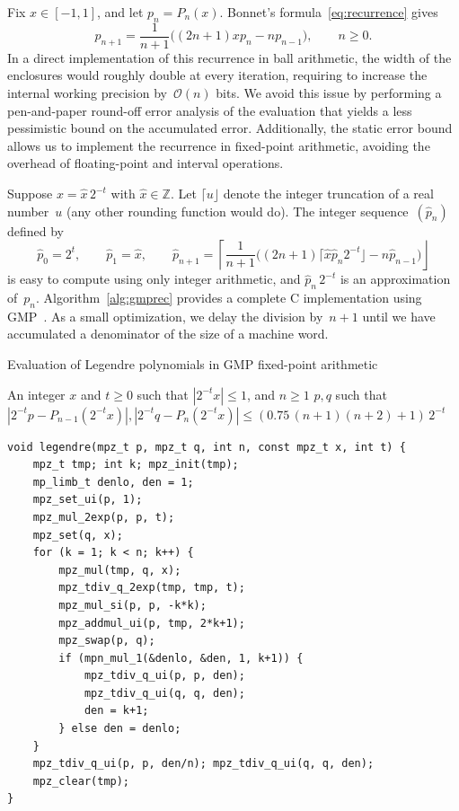 \documentclass{siamart0216}
\newcommand{\OO}{\mathcal{O}}
\begin{document}
Fix $x \in [-1, 1]$, and let $p_n = P_n(x)$.
Bonnet's formula~\eqref{eq:recurrence} gives
\begin{equation} \label{eq:rec-bis}
  p_{n + 1} =
    \frac{1}{n+1}
    \bigl( (2n +1) x p_n - n p_{n-1} \bigr),
  \qquad n \geq 0.
\end{equation}
In a direct implementation of this recurrence in ball arithmetic, the
width of the enclosures would roughly double at every iteration,
requiring to increase the internal working precision by $\OO(n)$ bits.
We avoid this issue by performing a pen-and-paper round-off error
analysis of the evaluation that yields a less pessimistic bound on the
accumulated error.
Additionally, the static error bound allows us to implement the
recurrence in fixed-point arithmetic, avoiding the overhead of
floating-point and interval operations.

Suppose $x = \hat x \, 2^{-t}$ with $\hat x \in \mathbb Z$.
Let $\lceil u \rfloor$ denote the integer truncation of a real
number~$u$ (any other rounding function would do).
The integer sequence $(\hat p_n)$ defined by
\begin{equation} \label{eq:rec-fxpt}
  \hat{p}_0 = 2^t, \qquad
  \hat{p}_1 = \hat x, \qquad
  \hat{p}_{n + 1} =
    \left\lceil \frac{1}{n + 1}  \bigl( (2 n + 1) \lceil \hat{x}
      \hat{p}_n 2^{- t} \rfloor - n \hat{p}_{n - 1} \bigr)
    \right\rfloor
\end{equation}
is easy to compute using only integer arithmetic, and
$\hat p_n \, 2^{-t}$ is an approximation of~$p_n$.
Algorithm~\ref{alg:gmprec} provides a complete C implementation
using GMP~\cite{granlund2017}.
As a small optimization, we delay the division by~$n+1$ until we have
accumulated a denominator of the size of a machine word.

\begin{algorithm}[h!]
  \caption{Evaluation of Legendre polynomials in GMP fixed-point arithmetic}
  \small
  \label{alg:gmprec}
  \begin{algorithmic}[1]
    \Require An integer $x$ and $t \ge 0$ such that $|2^{-t} x| \le 1$, and $n \ge 1$
    \Ensure $p, q$ such that $|2^{-t} p - P_{n-1}(2^{-t} x)|, |2^{-t} q - P_{n}(2^{-t} x)| \le (0.75 \, (n+1)(n+2) + 1) \, 2^{-t}$
  \end{algorithmic}
\begin{verbatim}
void legendre(mpz_t p, mpz_t q, int n, const mpz_t x, int t) {
    mpz_t tmp; int k; mpz_init(tmp);
    mp_limb_t denlo, den = 1;
    mpz_set_ui(p, 1);
    mpz_mul_2exp(p, p, t);
    mpz_set(q, x);
    for (k = 1; k < n; k++) {
        mpz_mul(tmp, q, x);
        mpz_tdiv_q_2exp(tmp, tmp, t);
        mpz_mul_si(p, p, -k*k);
        mpz_addmul_ui(p, tmp, 2*k+1);
        mpz_swap(p, q);
        if (mpn_mul_1(&denlo, &den, 1, k+1)) {
            mpz_tdiv_q_ui(p, p, den);
            mpz_tdiv_q_ui(q, q, den);
            den = k+1;
        } else den = denlo;
    }
    mpz_tdiv_q_ui(p, p, den/n); mpz_tdiv_q_ui(q, q, den);
    mpz_clear(tmp);
}
\end{verbatim}
\end{algorithm}
\end{document}
